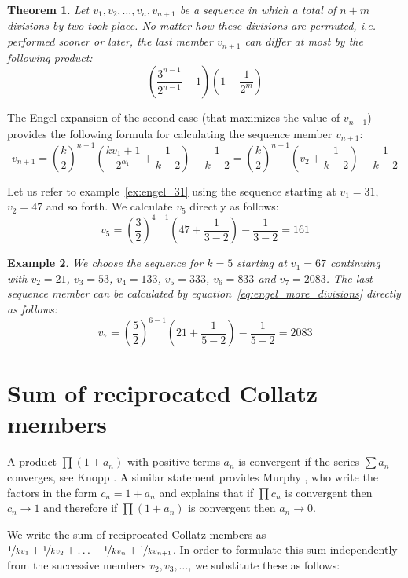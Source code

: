\documentclass[12pt]{amsart}
\newtheorem{theorem}{Theorem}[section]
\newtheorem{example}[theorem]{Example}
\theoremstyle{definition}
\begin{document}
\par\medskip
\begin{theorem}
	\label{theo:permutation}
	Let $v_1,v_2,\ldots,v_n,v_{n+1}$ be a sequence in which a total of $n+m$ divisions by two took place. No matter how these divisions are permuted, i.e. performed sooner or later, the last member $v_{n+1}$ can differ at most by the following product:
	\[
	\left(\frac{3^{n-1}}{2^{n-1}}-1\right)\left(1-\frac{1}{2^m}\right)
	\]
\end{theorem}

The Engel expansion of the second case (that maximizes the value of $v_{n+1}$) provides the following formula for calculating the sequence member $v_{n+1}$:
\begin{equation}
\label{eq:engel_more_divisions}
v_{n+1}=\left(\frac{k}{2}\right)^{n-1}\left(\frac{kv_1+1}{2^{\alpha_1}}+\frac{1}{k-2}\right)-\frac{1}{k-2}=\left(\frac{k}{2}\right)^{n-1}\left(v_2+\frac{1}{k-2}\right)-\frac{1}{k-2}
\end{equation}

Let us refer to example~\ref{ex:engel_31} using the sequence starting at $v_1=31$, $v_2=47$ and so forth. We calculate $v_5$ directly as follows:
\[
v_5=\left(\frac{3}{2}\right)^{4-1}\left(47+\frac{1}{3-2}\right)-\frac{1}{3-2}=161
\]

\begin{example}
\label{ex:engel_67}
We choose the sequence for $k=5$ starting at $v_1=67$ continuing with $v_2=21$, $v_3=53$, $v_4=133$, $v_5=333$, $v_6=833$ and $v_7=2083$. The last sequence member can be calculated by equation~\ref{eq:engel_more_divisions} directly as follows:
\[
v_7=\left(\frac{5}{2}\right)^{6-1}\left(21+\frac{1}{5-2}\right)-\frac{1}{5-2}=2083
\]
\end{example}

\section{Sum of reciprocated Collatz members}
\label{sum_reciprocal_vertices}
A product $\prod(1+a_n)$ with positive terms $a_n$ is convergent if the series $\sum a_n$ converges, see Knopp \cite[p.~220]{Ref_Knopp}. A similar statement provides Murphy \cite{Ref_Murphy}, who write the factors in the form $c_n=1+a_n$ and explains that if $\prod c_n$ is convergent then $c_n\rightarrow1$ and therefore if $\prod (1+a_n)$ is convergent then $a_n\rightarrow0$.

\par\medskip
We write the sum of reciprocated Collatz members as $\nicefrac{1}{kv_1}+\nicefrac{1}{kv_2}+\ldots+\nicefrac{1}{kv_n}+\nicefrac{1}{kv_{n+1}}$. In order to formulate this sum independently from the successive members $v_2,v_3,\ldots$, we substitute these as follows:
\end{document}
